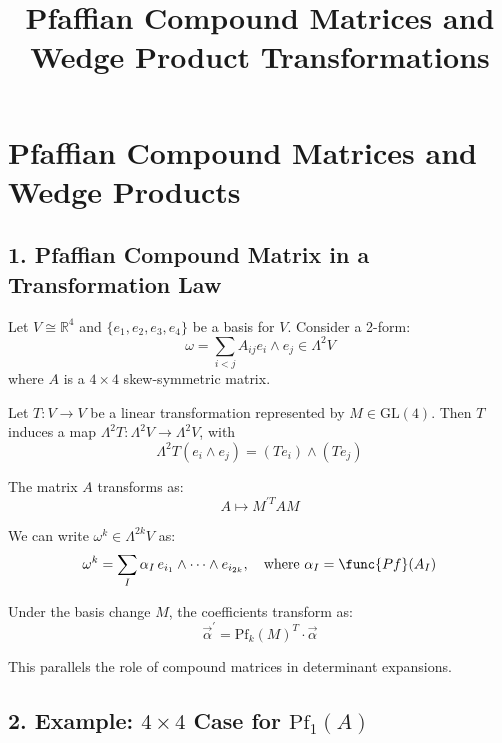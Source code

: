 \documentclass[aps,prd,onecolumn,notitlepage,nofootinbib]{revtex4-2}
\begin{document}
\title{Pfaffian Compound Matrices and Wedge Product Transformations}
\author{}
\date{}
\maketitle

\section*{Pfaffian Compound Matrices and Wedge Products}

\subsection*{1. Pfaffian Compound Matrix in a Transformation Law}

Let $V \cong \mathbb{R}^4$ and $\{e_1, e_2, e_3, e_4\}$ be a basis for $V$.
Consider a 2-form: 
\begin{equation}
\omega = \sum_{i<j} A_{ij} e_i \wedge e_j \in \Lambda^2 V
\end{equation}
where $A$ is a $4 \times 4$ skew-symmetric matrix.

Let $T: V \to V$ be a linear transformation represented by $M \in \mathrm{GL}%
(4)$. Then $T$ induces a map $\Lambda^2 T: \Lambda^2 V \to \Lambda^2 V$,
with 
\begin{equation}
\Lambda^2 T(e_i \wedge e_j) = (T e_i) \wedge (T e_j)
\end{equation}

The matrix $A$ transforms as: 
\begin{equation}
A\mapsto M^{\prime T}AM
\end{equation}

We can write $\omega^k \in \Lambda^{2k} V$ as: 
\begin{equation}
\omega^k = \sum_I \alpha_I \, e_{i_1} \wedge \cdots \wedge e_{i_{2k}}, \quad 
\text{where } \alpha_I = \func{Pf}(A_I)
\end{equation}

Under the basis change $M$, the coefficients transform as: 
\begin{equation}
\vec{\alpha}^{\prime }= \mathrm{Pf}_k(M)^T \cdot \vec{\alpha}
\end{equation}

This parallels the role of compound matrices in determinant expansions.

\subsection*{2. Example: $4 \times 4$ Case for $\mathrm{Pf}_1(A)$}
\end{document}
